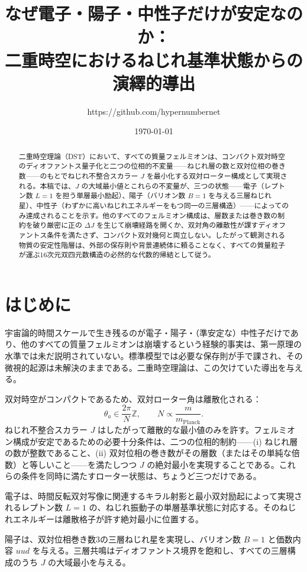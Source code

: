 \documentclass[a4paper]{article}
\title{なぜ電子・陽子・中性子だけが安定なのか：\\
二重時空におけるねじれ基準状態からの演繹的導出}
\author{https://github.com/hypernumbernet}
\date{\today}
\begin{document}
\maketitle

\begin{abstract}
二重時空理論（DST）において、すべての質量フェルミオンは、コンパクト双対時空のディオファントス量子化と二つの位相的不変量——ねじれ層の数と双対位相の巻き数——のもとでねじれ不整合スカラー \(J\) を最小化する双対ローター構成として実現される。本稿では、\(J\) の大域最小値とこれらの不変量が、三つの状態——電子（レプトン数 \(L=1\) を担う単層最小励起）、陽子（バリオン数 \(B=1\) を与える三層ねじれ星）、中性子（わずかに高いねじれエネルギーをもつ同一の三層構造）——によってのみ達成されることを示す。他のすべてのフェルミオン構成は、層数または巻き数の制約を破り厳密に正の \(\Delta J\) を生じて崩壊経路を開くか、双対角の離散性が課すディオファントス条件を満たさず、コンパクト双対幾何と両立しない。したがって観測される物質の安定性階層は、外部の保存則や背景連続体に頼ることなく、すべての質量粒子が運ぶ16次元双四元数構造の必然的な代数的帰結として従う。

\end{abstract}

\section{はじめに}

宇宙論的時間スケールで生き残るのが電子・陽子・（準安定な）中性子だけであり、他のすべての質量フェルミオンは崩壊するという経験的事実は、第一原理の水準では未だ説明されていない。標準模型では必要な保存則が手で課され、その微視的起源は未解決のままである。二重時空理論は、この欠けていた導出を与える。

双対時空がコンパクトであるため、双対ローター角は離散化される：
\[
\theta_a\in\frac{2\pi}{N}\mathbb{Z},\qquad N\propto\frac{m}{m_\text{Planck}}.
\]
ねじれ不整合スカラー \(J\) はしたがって離散的な最小値のみを許す。フェルミオン構成が安定であるための必要十分条件は、二つの位相的制約——(i) ねじれ層の数が整数であること、(ii) 双対位相の巻き数がその層数（またはその単純な倍数）と等しいこと——を満たしつつ \(J\) の絶対最小を実現することである。これらの条件を同時に満たすローター状態は、ちょうど三つだけである。

電子は、時間反転双対写像に関連するキラル射影と最小双対励起によって実現されるレプトン数 \(L=1\) の、ねじれ振動子の単層基準状態に対応する。そのねじれエネルギーは離散格子が許す絶対最小に位置する。

陽子は、双対位相巻き数3の三層ねじれ星を実現し、バリオン数 \(B=1\) と価数内容 \(uud\) を与える。三層共鳴はディオファントス境界を飽和し、すべての三層構成のうち \(J\) の大域最小を与える。
\end{document}
